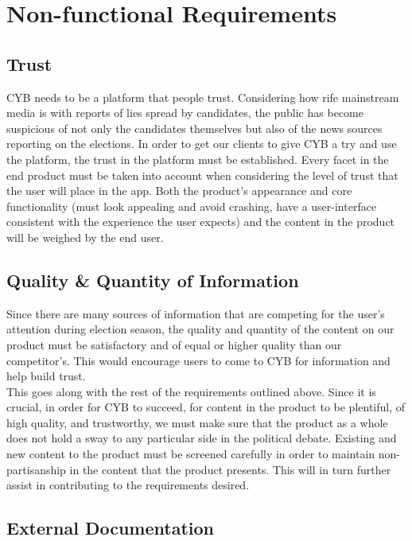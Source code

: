 \documentclass[11pt]{article}
\begin{document}
\section*{Non-functional Requirements}

\subsection{Trust}

CYB needs to be a platform that people trust. Considering how rife mainstream media is with reports of lies spread by candidates, the public has become suspicious of not only the candidates themselves but also of the news sources reporting on the elections. In order to get our clients to give CYB a try and use the platform, the trust in the platform must be established. Every facet in the end product must be taken into account when considering the level of trust that the user will place in the app. Both the product's appearance and core functionality (must look appealing and avoid crashing, have a user-interface consistent with the experience the user expects) and the content in the product will be weighed by the end user.

\subsection{Quality \& Quantity of Information}

Since there are many sources of information that are competing for the user's attention during election season, the quality and quantity of the content on our product must be satisfactory and of equal or higher quality than our competitor's. This would encourage users to come to CYB for information and help build trust.\\

This goes along with the rest of the requirements outlined above. Since it is crucial, in order for CYB to succeed, for content in the product to be plentiful, of high quality, and trustworthy, we must make sure that the product as a whole does not hold a sway to any particular side in the political debate. Existing and new content to the product must be screened carefully in order to maintain non-partisanship in the content that the product presents. This will in turn further assist in contributing to the requirements desired.

\subsection{External Documentation}
\end{document}
